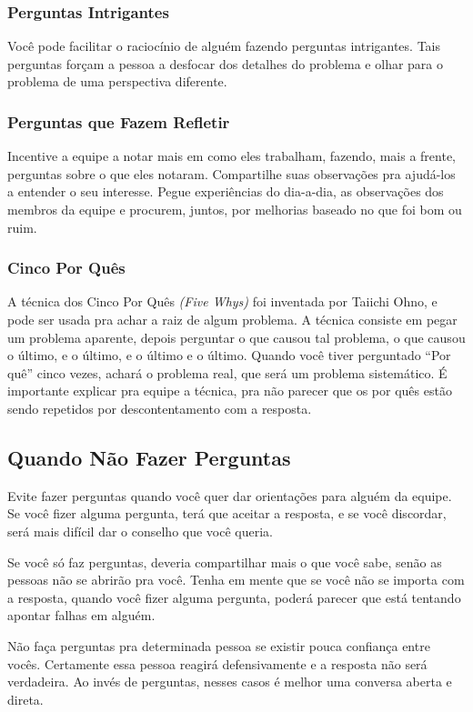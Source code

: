 \documentclass[a4paper, 10pt, font=plain]{abnt}
\begin{document}
\subsubsection{Perguntas Intrigantes}
Você pode facilitar o raciocínio de alguém fazendo perguntas intrigantes. Tais perguntas forçam a pessoa a desfocar dos detalhes do problema e olhar para o problema de uma perspectiva diferente.

\subsubsection{Perguntas que Fazem Refletir}
Incentive a equipe a notar mais em como eles trabalham, fazendo, mais a frente, perguntas sobre o que eles notaram. Compartilhe suas observações pra ajudá-los a entender o seu interesse. Pegue experiências do dia-a-dia, as observações dos membros da equipe e procurem, juntos, por melhorias baseado no que foi bom ou ruim.

\subsubsection{Cinco Por Quês}
A técnica dos Cinco Por Quês \textit{(Five Whys)} foi inventada por Taiichi Ohno, e pode ser usada pra achar a raiz de algum problema. A técnica consiste em pegar um problema aparente, depois perguntar o que causou tal problema, o que causou o último, e o último, e o último e o último. Quando você tiver perguntado ``Por quê'' cinco vezes, achará o problema real, que será um problema sistemático. É importante explicar pra equipe a técnica, pra não parecer que os por quês estão sendo repetidos por descontentamento com a resposta.


\subsection{Quando Não Fazer Perguntas}
Evite fazer perguntas quando você quer dar orientações para alguém da equipe. Se você fizer alguma pergunta, terá que aceitar a resposta, e se você discordar, será mais difícil dar o conselho que você queria.

Se você só faz perguntas, deveria compartilhar mais o que você sabe, senão as pessoas não se abrirão pra você. Tenha em mente que se você não se importa com a resposta, quando você fizer alguma pergunta, poderá parecer que está tentando apontar falhas em alguém.

Não faça perguntas pra determinada pessoa se existir pouca confiança entre vocês. Certamente essa pessoa reagirá defensivamente e a resposta não será verdadeira. Ao invés de perguntas, nesses casos é melhor uma conversa aberta e direta.
\end{document}
